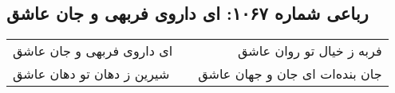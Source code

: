 \begin{center}
\section*{رباعی شماره ۱۰۶۷: ای داروی فربهی و جان عاشق}
\label{sec:1067}
\begin{longtable}{l p{0.5cm} r}
ای داروی فربهی و جان عاشق
&&
فربه ز خیال تو روان عاشق
\\
شیرین ز دهان تو دهان عاشق
&&
جان بنده‌ات ای جان و جهان عاشق
\\
\end{longtable}
\end{center}
